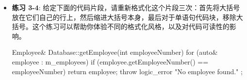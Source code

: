 \begin{itemize}
\item
\textbf{练习 3-4}: 给定下面的代码片段，请重新格式化这个片段三次：首先将大括号放在它们自己的行上，然后缩进大括号本身，最后对于单语句代码块，移除大括号。这个练习可以帮助你体验不同的格式化风格，以及对代码可读性的影响。

\begin{cpp}
Employee& Database::getEmployee(int employeeNumber)
{
    for (auto& employee : m_employees) {
        if (employee.getEmployeeNumber() == employeeNumber) {
            return employee;
        }
    }
    throw logic_error { "No employee found." };
}
\end{cpp}
\end{itemize}